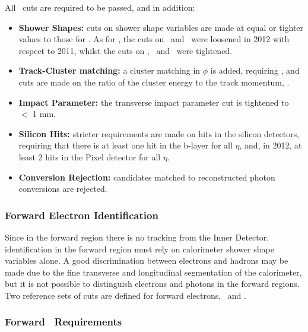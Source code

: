 All \mediumPP\ cuts are required to be passed, and in addition:

\begin{itemize}
    \item {\bf Shower Shapes:} cuts on shower shape variables are made at equal
    or tighter values to those for \mediumPP. As for \mediumPP,
    the cuts on \Reta\ and \Rhad\ were loosened in 2012 with respect to 2011, 
    whilst the cuts on  \wetatwo, \Eratio\ and
    \wstot\ were tightened.

    \item {\bf Track-Cluster matching:} a cluster matching in $\phi$ is added,
    requiring , and cuts are made on the ratio of the cluster
    energy to the track momentum, \Eoverp.

    \item {\bf Impact Parameter:} the
    transverse impact parameter cut is tightened to \dzero\ $<$ 1 mm.

    \item {\bf Silicon Hits:} stricter requirements are made on hits in the
    silicon detectors, requiring that there is at least one hit in the b-layer for
    all $\eta$, and, in 2012, at least 2 hits in the Pixel detector for all
    $\eta$.

    \item {\bf Conversion Rejection:} candidates matched to reconstructed photon
    conversions are rejected.

\end{itemize}

\subsubsection{Forward Electron Identification}

Since in the forward region there is no tracking from the Inner Detector,
identification in the forward region must rely on calorimeter shower shape
variables alone. A good discrimination between electrons and hadrons may be made
due to the fine transverse and longitudinal segmentation of the calorimeter, but
it is not possible to distinguish electrons and photons in the forward regions.
Two reference sets of cuts are defined for forward electrons, \loose\ and
\tight.

\subsubsection{Forward \loose\ Requirements}

